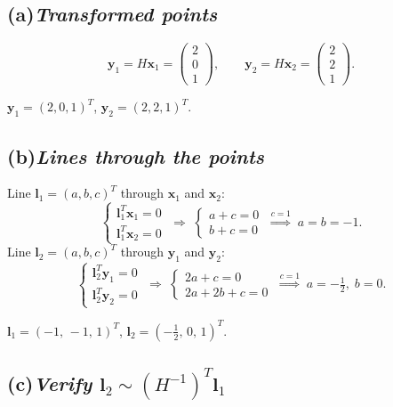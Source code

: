\documentclass[11pt,a4paper]{article}
\newcommand{\vb}[1]{\mathbf{#1}}
\newcommand{\vect}[1]{
    \begin{pmatrix}#1
\end{pmatrix}}
\newcommand{\task}[2]{
\subsection*{#1\quad\normalfont\textit{#2}}}
\begin{document}
\task{(a)}{Transformed points}

\[
    \vb{y}_1 = H\vb{x}_1 = \vect{2\\0\\1},\qquad
    \vb{y}_2 = H\vb{x}_2 = \vect{2\\2\\1}.
\]
\begin{answer}
    $\vb{y}_1 = (2,0,1)^T$, \quad $\vb{y}_2 = (2,2,1)^T$.
\end{answer}

\task{(b)}{Lines through the points}

Line $\vb{l}_1 = (a,b,c)^T$ through $\vb{x}_1$ and $\vb{x}_2$:
\[
    \begin{cases}
        \vb{l}_1^T\vb{x}_1 = 0\\
        \vb{l}_1^T\vb{x}_2 = 0
    \end{cases}
    \;\Longrightarrow\;
    \begin{cases}
        a + c = 0\\
        b + c = 0
    \end{cases}
    \;\overset{c=1}{\Longrightarrow}\; a = b = -1.
\]
Line $\vb{l}_2 = (a,b,c)^T$ through $\vb{y}_1$ and $\vb{y}_2$:
\[
    \begin{cases}
        \vb{l}_2^T\vb{y}_1 = 0\\
        \vb{l}_2^T\vb{y}_2 = 0
    \end{cases}
    \;\Longrightarrow\;
    \begin{cases}
        2a + c = 0\\
        2a + 2b + c = 0
    \end{cases}
    \;\overset{c=1}{\Longrightarrow}\; a = -\tfrac{1}{2},\; b = 0.
\]
\begin{answer}
    $\vb{l}_1 = (-1,\,-1,\,1)^T$, \quad $\vb{l}_2 =
    \left(-\tfrac{1}{2},\,0,\,1\right)^T$.
\end{answer}

\task{(c)}{Verify $\vb{l}_2 \sim (H^{-1})^T\vb{l}_1$}
\end{document}
